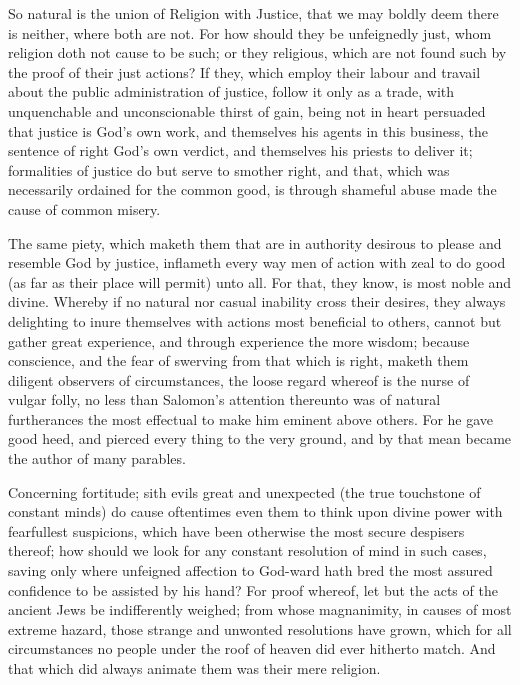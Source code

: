 So natural is the union of Religion with Justice, that we may boldly deem there is neither, where both are not. For how should they be unfeignedly just, whom religion doth not cause to be such; or they religious, which are not found such by the proof of their just actions? If they, which employ their labour and travail about the public administration of justice, follow it only as a trade, with unquenchable and unconscionable thirst of gain, being not in heart persuaded that justice is God’s own work, and themselves his agents in this business, the sentence of right God’s own verdict, and themselves his priests to deliver it; formalities of justice do but serve to smother right, and that, which was necessarily ordained for the common good, is through shameful abuse made the cause of common misery.

The same piety, which maketh them that are in authority desirous to please and resemble God by justice, inflameth  every way men of action with zeal to do good (as far as their place will permit) unto all. For that, they know, is most noble and divine. Whereby if no natural nor casual inability cross their desires, they always delighting to inure themselves with actions most beneficial to others, cannot but gather great experience, and through experience the more wisdom; because conscience, and the fear of swerving from that which is right, maketh them diligent observers of circumstances, the loose regard whereof is the nurse of vulgar folly, no less than Salomon’s attention thereunto was of natural furtherances the most effectual to make him eminent above others. For he gave good heed, and pierced every thing to the very ground, and by that mean became the author of many parables.

Concerning fortitude; sith evils great and unexpected (the true touchstone of constant minds) do cause oftentimes even them to think upon divine power with fearfullest suspicions, which have been otherwise the most secure despisers thereof; how should we look for any constant resolution of mind in such cases, saving only where unfeigned affection to God-ward hath bred the most assured confidence to be assisted by his hand? For proof whereof, let but the acts of the ancient Jews be indifferently weighed; from whose magnanimity, in causes of most extreme hazard, those strange and unwonted resolutions have grown, which for all circumstances no people under the roof of heaven did ever hitherto match. And that which did always animate them was their mere religion.

